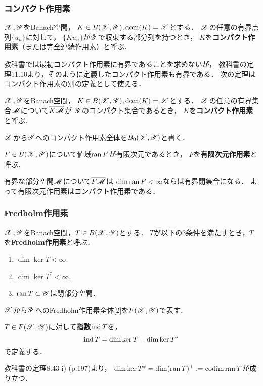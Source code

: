    \subsubsection{コンパクト作用素}
    \begin{Def}
        $\mathscr{X}, \mathscr{Y}$をBanach空間，
        $K \in B(\mathscr{X}, \mathscr{Y}), \operatorname{dom}(K)=\mathscr{X}$とする．
        $\mathscr{X}$の任意の有界点列$\{u_n\}$に対して，
        $\{Ku_n\}$が$\mathscr{Y}$で収束する部分列を持つとき，
        $K$を\textbf{コンパクト作用素}（または完全連続作用素）と呼ぶ．
    \end{Def}
    教科書では最初コンパクト作用素に有界であることを求めないが，
    教科書の定理11.10より，そのように定義したコンパクト作用素も有界である．
    次の定理はコンパクト作用素の別の定義として使える．
    \begin{Def}[定理11.9, p.257]
        $\mathscr{X}, \mathscr{Y}$をBanach空間，
        $K \in B(\mathscr{X}, \mathscr{Y}), \operatorname{dom}(K)=\mathscr{X}$とする．
        $\mathscr{X}$の任意の有界集合$\mathscr{M}$について$\overline{K \mathscr{M}}$が
        $\mathscr{Y}$のコンパクト集合であるとき，
        $K$を\textbf{コンパクト作用素}と呼ぶ．
    \end{Def}
    $\mathscr{X}$から$\mathscr{Y}$へのコンパクト作用素全体を$B_0(\mathscr{X},\mathscr{Y})$と書く．
    \begin{Def}
        $F \in B(\mathscr{X}, \mathscr{Y})$について値域$\operatorname{ran} F$が有限次元であるとき，
        $F$を\textbf{有限次元作用素}と呼ぶ．
    \end{Def}
    有界な部分空間$\mathscr{M}$について$\overline{F \mathscr{M}}$は
    $\dim \operatorname{ran} F<\infty$ならば有界閉集合になる．
    よって有限次元作用素はコンパクト作用素である．

    \subsubsection{Fredholm作用素}
    \begin{Def}
        $\mathscr{X}, \mathscr{Y}$をBanach空間，$T \in B(\mathscr{X}, \mathscr{Y})$とする．
        $T$が以下の3条件を満たすとき，$T$を\textbf{Fredholm作用素}と呼ぶ．
        \begin{enumerate}
            \item $\dim \ker T < \infty$.
            \item $\dim \ker T^* < \infty$.
            \item $\operatorname{ran}{T} \subset \mathscr{Y}$は閉部分空間．
        \end{enumerate}
    \end{Def}
    $\mathscr{X}$から$\mathscr{Y}$へのFredholm作用素全体[2]を$F(\mathscr{X},\mathscr{Y})$で表す．
    \begin{Def}
        $T \in F(\mathscr{X},\mathscr{Y})$に対して\textbf{指数}$\operatorname{ind} T$を，
        \[ \operatorname{ind} T=\dim \ker T-\dim \ker T^* \]
        で定義する．
    \end{Def}
    教科書の定理8.43 i) (p.197)より，
    $\dim \ker T^*=\dim (\operatorname{ran} T)^{\perp}:=\operatorname{codim} \operatorname{ran} T$が成り立つ．

